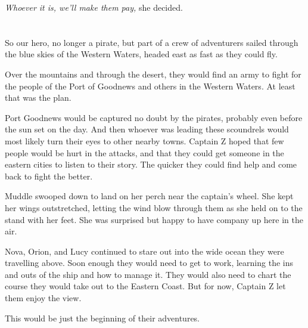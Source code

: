 \documentclass[12pt]{extbook}
\begin{document}
  \emph{Whoever it is, we'll make them pay,} she decided.
  
  \section{}\label{section-41}
  
  So our hero, no longer a pirate, but part of a crew of adventurers
  sailed through the blue skies of the Western Waters, headed east as fast
  as they could fly.
  
  Over the mountains and through the desert, they would find an army to
  fight for the people of the Port of Goodnews and others in the Western
  Waters. At least that was the plan.
  
  Port Goodnews would be captured no doubt by the pirates, probably even
  before the sun set on the day. And then whoever was leading these
  scoundrels would most likely turn their eyes to other nearby towns.
  Captain Z hoped that few people would be hurt in the attacks, and that
  they could get someone in the eastern cities to listen to their story.
  The quicker they could find help and come back to fight the better.
  
  Muddle swooped down to land on her perch near the captain's wheel. She
  kept her wings outstretched, letting the wind blow through them as she
  held on to the stand with her feet. She was surprised but happy to have
  company up here in the air.
  
  Nova, Orion, and Lucy continued to stare out into the wide ocean they
  were travelling above. Soon enough they would need to get to work,
  learning the ins and outs of the ship and how to manage it. They would
  also need to chart the course they would take out to the Eastern Coast.
  But for now, Captain Z let them enjoy the view.
  
  This would be just the beginning of their adventures.
\end{document}
